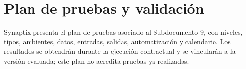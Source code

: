 \documentclass[11pt,letterpaper]{report}
\begin{document}
\tableofcontents\clearpage
\chapter*{Plan de pruebas y validación}
Synaptix presenta el plan de pruebas asociado al Subdocumento 9, con niveles, tipos, ambientes, datos, entradas, salidas, automatización y calendario. Los resultados se obtendrán durante la ejecución contractual y se vincularán a la versión evaluada; este plan no acredita pruebas ya realizadas. \parencite[Formulario T-13, p.~62]{sd9-ba}

\CierreSubdocumento
\end{document}
